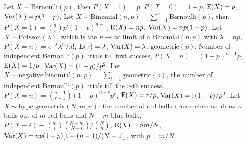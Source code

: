  Let $X\sim\mathrm{Bernoulli}(p)$, then $P(X = 1) = p$, $P(X=0) = 1-p$, $\operatorname{E}(X) = p$, $\operatorname{Var}(X) = p(1-p)$.
 Let $X\sim\mathrm{Binomial}(n, p) = \sum^{n}_{i=1} \mathrm{Bernoulli}(p)$, then $P(X = 1) = \binom{n}{i}p^i(1-p)^{n-i}$, $\operatorname{E}(X) = np$, $\operatorname{Var}(X) = np(1-p)$.
 Let $X \sim \mathrm{Poisson}(\lambda)$, which is the $n \to \infty$ limit of a $\mathrm{Binomial}(n,p)$ with $\lambda = np$, $P(X = n) = e^{-\lambda}\lambda^n/n!$, $\operatorname{E}(x) = \lambda$, $\operatorname{Var}(X) = \lambda$.
 $\mathrm{geometric}(p)$: Number of independent $\mathrm{Bernoulli}(p)$ trials till first success, $P(X = n) = (1-p)^{n-1}p$, $\operatorname{E}(X) = 1/p$, $\operatorname{Var}(X) = (1-p)/p^2$.
 Let $X \sim \mathrm{negative\ binomial}(n,p) = \sum^{r}_{i = 1} \mathrm{geometric}(p)$, the number of independent $\mathrm{Bernoulli}(p)$ trials till the $r$-th success, $P(X = n) = \binom{n-1}{r-1}(1-p)^{n-r} p^r$, $\operatorname{E}(X) = r/p$, $\operatorname{Var}(X) = r(1-p)/p^2$.
 Let $X \sim \mathrm{hypergeometrix}(N,m,n)$: the number of red balls drawn ehen we draw $n$ balls out of $m$ red balls and $N-m$ blue balls, $P(X=i) = \binom{m}{i}\binom{N-m}{N-i}/\binom{N}{n}$, $\operatorname{E}(X) = nm/N$, $\operatorname{Var}(X) = np(1-p)[1-(n-1)/(N-1)]$, with $p = m/N$.